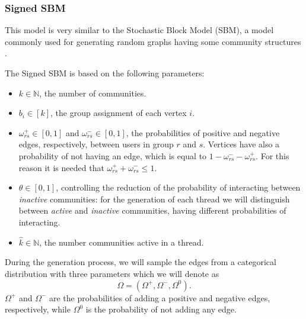 \subsubsection{Signed SBM}%
\label{ssub:signed_sbm}

This model is very similar to the Stochastic Block Model (SBM), a model
commonly used for generating random graphs having some community structures
\cite{Newman2018}.

The Signed SBM is based on the following parameters:
\begin{itemize}
	\item $k \in \mathbb{N}$, the number of communities.
	\item $b_{i} \in [k]$, the group assignment of each vertex $i$.
	\item $\omega ^{+} _{rs} \in [0, 1]$ and $\omega ^{-} _{rs} \in [0, 1]$, the probabilities
	      of positive and negative edges, respectively, between users in
	      group $r$ and $s$. Vertices have also a probability of not having an
	      edge, which is equal to $1 - \omega ^{-} _{rs} - \omega ^{+} _{rs} $.
	      For this reason it is needed that $\omega ^{+} _{rs} + \omega ^{-} _{rs} \leq 1$.
	\item $\theta \in [0, 1]$, controlling the reduction of the probability of interacting
	      between \emph{inactive} communities: for the generation of each
	      thread we will distinguish between \emph{active} and \emph{inactive}
	      communities, having different probabilities of interacting.
	\item $\hat{k} \in \mathbb{N}$, the number communities active in
	      a thread.
\end{itemize}

During the generation process, we will sample the edges from a categorical
distribution with three parameters which we will denote as
\begin{equation*}
	\Omega = (\Omega^+, \Omega ^-, \Omega ^0).
\end{equation*}
$\Omega ^+$ and $\Omega ^-$ are the probabilities of adding a positive and
negative edges, respectively, while $\Omega ^0$ is the probability of not
adding any edge.

\bigskip

